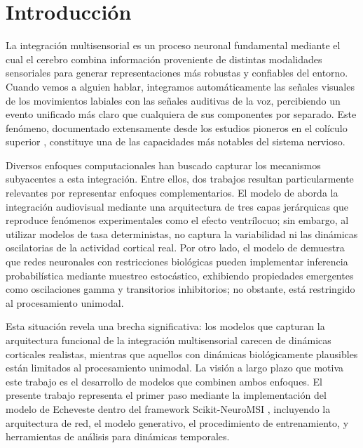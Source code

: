 \documentclass[spanish,a4paper,11pt]{article}
\begin{document}
\section{Introducción}
\label{sec:intro}

La integración multisensorial es un proceso neuronal fundamental mediante el cual el cerebro combina información proveniente de distintas modalidades sensoriales para generar representaciones más robustas y confiables del entorno. Cuando vemos a alguien hablar, integramos automáticamente las señales visuales de los movimientos labiales con las señales auditivas de la voz, percibiendo un evento unificado más claro que cualquiera de sus componentes por separado. Este fenómeno, documentado extensamente desde los estudios pioneros en el colículo superior \citep{stein2012new}, constituye una de las capacidades más notables del sistema nervioso.

Diversos enfoques computacionales han buscado capturar los mecanismos subyacentes a esta integración. Entre ellos, dos trabajos resultan particularmente relevantes por representar enfoques complementarios. El modelo de \citet{cuppini2017biologically} aborda la integración audiovisual mediante una arquitectura de tres capas jerárquicas que reproduce fenómenos experimentales como el efecto ventrílocuo; sin embargo, al utilizar modelos de tasa deterministas, no captura la variabilidad ni las dinámicas oscilatorias de la actividad cortical real. Por otro lado, el modelo de \citet{echeveste2020cortical} demuestra que redes neuronales con restricciones biológicas pueden implementar inferencia probabilística mediante muestreo estocástico, exhibiendo propiedades emergentes como oscilaciones gamma y transitorios inhibitorios; no obstante, está restringido al procesamiento unimodal.

Esta situación revela una brecha significativa: los modelos que capturan la arquitectura funcional de la integración multisensorial carecen de dinámicas corticales realistas, mientras que aquellos con dinámicas biológicamente plausibles están limitados al procesamiento unimodal. La visión a largo plazo que motiva este trabajo es el desarrollo de modelos que combinen ambos enfoques. El presente trabajo representa el primer paso mediante la implementación del modelo de Echeveste dentro del framework Scikit-NeuroMSI \citep{paredes2025scikit}, incluyendo la arquitectura de red, el modelo generativo, el procedimiento de entrenamiento, y herramientas de análisis para dinámicas temporales.

\end{document}
